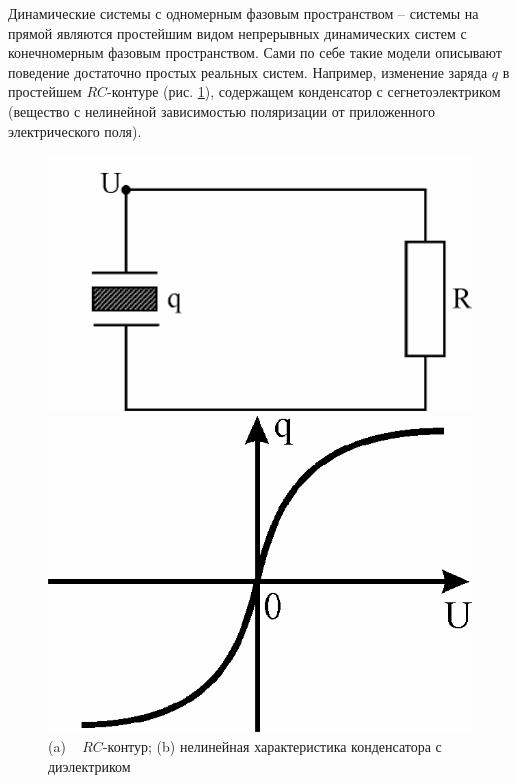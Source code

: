 	Динамические системы с одномерным фазовым пространством – системы
на прямой являются простейшим видом непрерывных динамических систем с
конечномерным фазовым пространством. Сами по себе такие модели
описывают поведение достаточно простых реальных систем. Например,
изменение заряда $q$ в простейшем $RC$-контуре (рис. \ref{fig:2.1}), содержащем конденсатор с сегнетоэлектриком (вещество с нелинейной зависимостью поляризации от приложенного электрического поля).
\begin{figure}[h!]
	\begin{minipage}{0.49\linewidth}
		\centering
		\includegraphics[]{fig/lect2/1a}
	\end{minipage}
	\hfill
	\begin{minipage}{0.49\linewidth}
		\centering
		\includegraphics[]{fig/lect2/1b}
	\end{minipage}
	\caption{(a) ~ $RC$-контур; (b) нелинейная характеристика конденсатора с диэлектриком}
	\label{fig:2.1}
\end{figure}

